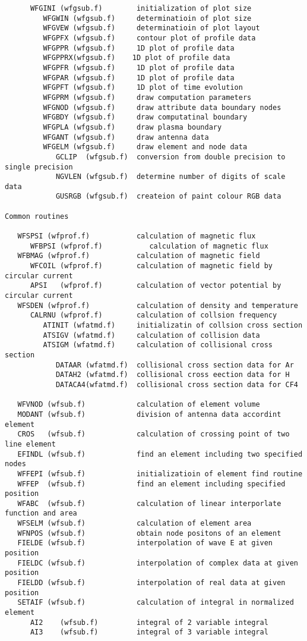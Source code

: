 \begin{verbatim}
      WFGINI (wfgsub.f)        initialization of plot size
         WFGWIN (wfgsub.f)     determinatioin of plot size
         WFGVEW (wfgsub.f)     determinatioin of plot layout
         WFGPFX (wfgsub.f)     contour plot of profile data
         WFGPPR (wfgsub.f)     1D plot of profile data
         WFGPPRX(wfgsub.f)    1D plot of profile data
         WFGPFR (wfgsub.f)     1D plot of profile data
         WFGPAR (wfgsub.f)     1D plot of profile data
         WFGPFT (wfgsub.f)     1D plot of time evolution
         WFGPRM (wfgsub.f)     draw computation parameters
         WFGNOD (wfgsub.f)     draw attribute data boundary nodes
         WFGBDY (wfgsub.f)     draw computatinal boundary
         WFGPLA (wfgsub.f)     draw plasma boundary
         WFGANT (wfgsub.f)     draw antenna data
         WFGELM (wfgsub.f)     draw element and node data
            GCLIP  (wfgsub.f)  conversion from double precision to single precision
            NGVLEN (wfgsub.f)  determine number of digits of scale data
            GUSRGB (wfgsub.f)  createion of paint colour RGB data

Common routines

   WFSPSI (wfprof.f)           calculation of magnetic flux
      WFBPSI (wfprof.f)           calculation of magnetic flux
   WFBMAG (wfprof.f)           calculation of magnetic field
      WFCOIL (wfprof.f)        calculation of magnetic field by circular current
      APSI   (wfprof.f)        calculation of vector potential by circular current
   WFSDEN (wfprof.f)           calculation of density and temperature
      CALRNU (wfprof.f)        calculation of collsion frequency
         ATINIT (wfatmd.f)     initializatin of collsion cross section
         ATSIGV (wfatmd.f)     calculation of collision data
         ATSIGM (wfatmd.f)     calculation of collisional cross section
            DATAAR (wfatmd.f)  collisional cross section data for Ar
            DATAH2 (wfatmd.f)  collisional cross eection data for H
            DATACA4(wfatmd.f)  collisional cross section data for CF4

   WFVNOD (wfsub.f)            calculation of element volume
   MODANT (wfsub.f)            division of antenna data accordint element
   CROS   (wfsub.f)            calculation of crossing point of two line element
   EFINDL (wfsub.f)            find an element including two specified nodes
   WFFEPI (wfsub.f)            initializatioin of element find routine
   WFFEP  (wfsub.f)            find an element including specified position
   WFABC  (wfsub.f)            calculation of linear interporlate function and area
   WFSELM (wfsub.f)            calculation of element area
   WFNPOS (wfsub.f)            obtain node positons of an element
   FIELDE (wfsub.f)            interpolation of wave E at given position
   FIELDC (wfsub.f)            interpolation of complex data at given position
   FIELDD (wfsub.f)            interpolation of real data at given position
   SETAIF (wfsub.f)            calculation of integral in normalized element
      AI2    (wfsub.f)         integral of 2 variable integral
      AI3    (wfsub.f)         integral of 3 variable integral


\end{verbatim}
